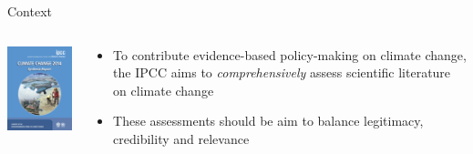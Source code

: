 \documentclass[9pt]{beamer}
\begin{document}
\begin{frame}{Context}

\begin{columns}
	\begin{column}{0.5\linewidth}
		\begin{center}
			\includegraphics[width=0.6\linewidth]{syrcover.png}
		\end{center}
	\end{column}
	\begin{column}{0.5\linewidth}
		\begin{center}
			\begin{itemize}
				\item To contribute evidence-based policy-making on climate change, the IPCC aims to \textit{comprehensively} assess scientific literature on climate change 
				\item These assessments should be aim to balance legitimacy, credibility and relevance \citep{Cash2001}
			\end{itemize}
		\end{center}
	\end{column}
\end{columns}

\end{frame}
\end{document}
